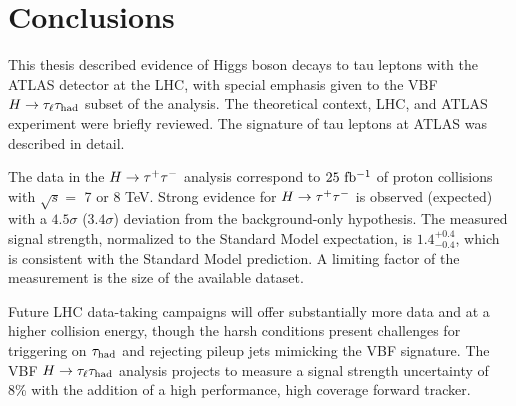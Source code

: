 \chapter[Conclusions][Conclusions]{Conclusions}
\label{chap:conclusion}

This thesis described evidence of Higgs boson decays to tau leptons with the ATLAS detector at the LHC, with special emphasis given to the VBF $H\rightarrow\tau_\ell\tau_\text{had}$ subset of the analysis. The theoretical context, LHC, and ATLAS experiment were briefly reviewed. The signature of tau leptons at ATLAS was described in detail.

The data in the ${H\rightarrow \tau^{+}\tau^{-}}$ analysis correspond to $25\ \mbox{fb$^{-1}$}$ of proton collisions with $\sqrt{s} = $ 7 or 8 TeV. Strong evidence for ${H\rightarrow \tau^{+}\tau^{-}}$ is observed (expected) with a $4.5\sigma$ ($3.4\sigma$) deviation from the background-only hypothesis. The measured signal strength, normalized to the Standard Model expectation, is $1.4^{+0.4}_{-0.4}$, which is consistent with the Standard Model prediction. A limiting factor of the measurement is the size of the available dataset.

Future LHC data-taking campaigns will offer substantially more data and at a higher collision energy, though the harsh conditions present challenges for triggering on $\tau_\text{had}$ and rejecting pileup jets mimicking the VBF signature. The VBF $H\rightarrow\tau_\ell\tau_\text{had}$ analysis projects to measure a signal strength uncertainty of 8\% with the addition of a high performance, high coverage forward tracker.





